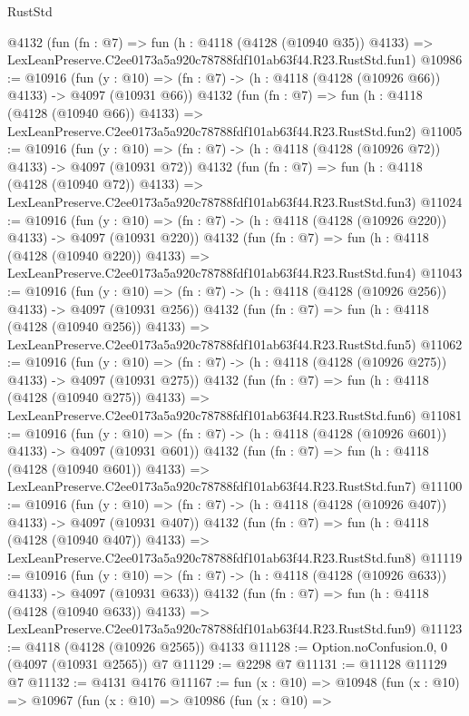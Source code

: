 \begin{lexlean}{RustStd}
\begin{coremodule}
    @4132
    (fun (fn : @7) =>
    fun (h : @4118 (@4128 (@10940 @35)) @4133) =>
    LexLeanPreserve.C2ee0173a5a920c78788fdf101ab63f44.R23.RustStd.fun1)
@10986 := @10916
    (fun (y : @10) => (fn : @7) -> (h : @4118 (@4128 (@10926 @66)) @4133) -> @4097 (@10931 @66))
    @4132
    (fun (fn : @7) =>
    fun (h : @4118 (@4128 (@10940 @66)) @4133) =>
    LexLeanPreserve.C2ee0173a5a920c78788fdf101ab63f44.R23.RustStd.fun2)
@11005 := @10916
    (fun (y : @10) => (fn : @7) -> (h : @4118 (@4128 (@10926 @72)) @4133) -> @4097 (@10931 @72))
    @4132
    (fun (fn : @7) =>
    fun (h : @4118 (@4128 (@10940 @72)) @4133) =>
    LexLeanPreserve.C2ee0173a5a920c78788fdf101ab63f44.R23.RustStd.fun3)
@11024 := @10916
    (fun (y : @10) => (fn : @7) -> (h : @4118 (@4128 (@10926 @220)) @4133) -> @4097 (@10931 @220))
    @4132
    (fun (fn : @7) =>
    fun (h : @4118 (@4128 (@10940 @220)) @4133) =>
    LexLeanPreserve.C2ee0173a5a920c78788fdf101ab63f44.R23.RustStd.fun4)
@11043 := @10916
    (fun (y : @10) => (fn : @7) -> (h : @4118 (@4128 (@10926 @256)) @4133) -> @4097 (@10931 @256))
    @4132
    (fun (fn : @7) =>
    fun (h : @4118 (@4128 (@10940 @256)) @4133) =>
    LexLeanPreserve.C2ee0173a5a920c78788fdf101ab63f44.R23.RustStd.fun5)
@11062 := @10916
    (fun (y : @10) => (fn : @7) -> (h : @4118 (@4128 (@10926 @275)) @4133) -> @4097 (@10931 @275))
    @4132
    (fun (fn : @7) =>
    fun (h : @4118 (@4128 (@10940 @275)) @4133) =>
    LexLeanPreserve.C2ee0173a5a920c78788fdf101ab63f44.R23.RustStd.fun6)
@11081 := @10916
    (fun (y : @10) => (fn : @7) -> (h : @4118 (@4128 (@10926 @601)) @4133) -> @4097 (@10931 @601))
    @4132
    (fun (fn : @7) =>
    fun (h : @4118 (@4128 (@10940 @601)) @4133) =>
    LexLeanPreserve.C2ee0173a5a920c78788fdf101ab63f44.R23.RustStd.fun7)
@11100 := @10916
    (fun (y : @10) => (fn : @7) -> (h : @4118 (@4128 (@10926 @407)) @4133) -> @4097 (@10931 @407))
    @4132
    (fun (fn : @7) =>
    fun (h : @4118 (@4128 (@10940 @407)) @4133) =>
    LexLeanPreserve.C2ee0173a5a920c78788fdf101ab63f44.R23.RustStd.fun8)
@11119 := @10916
    (fun (y : @10) => (fn : @7) -> (h : @4118 (@4128 (@10926 @633)) @4133) -> @4097 (@10931 @633))
    @4132
    (fun (fn : @7) =>
    fun (h : @4118 (@4128 (@10940 @633)) @4133) =>
    LexLeanPreserve.C2ee0173a5a920c78788fdf101ab63f44.R23.RustStd.fun9)
@11123 := @4118 (@4128 (@10926 @2565)) @4133
@11128 := Option.noConfusion.{0, 0} (@4097 (@10931 @2565)) @7
@11129 := @2298 @7
@11131 := @11128 @11129 @7
@11132 := @4131 @4176
@11167 := fun (x : @10) =>
  @10948
    (fun (x : @10) =>
    @10967
      (fun (x : @10) =>
      @10986
        (fun (x : @10) =>

\end{coremodule}
\end{lexlean}
